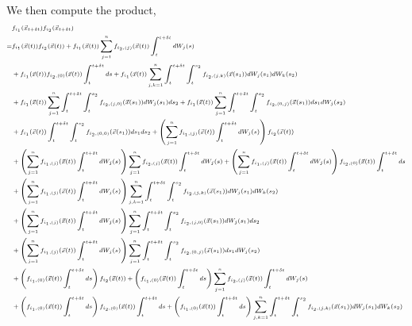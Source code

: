 \documentclass[12pt]{article}
\begin{document}
%
We then compute the product,
%
\begin{equation}
\scriptsize
\begin{aligned}
&f_{i_1}(\vec{x}_{t + \delta t}) f_{i_2}(\vec{x}_{t + \delta t}) \\
=& 
f_{i_1}(\vec{x}(t)) f_{i_2}(\vec{x}(t)) 
+  f_{i_1}(\vec{x}(t)) \sum_{j=1}^n f_{{i_2},(j)}(\vec{x}(t)) \int_t^{t + \delta t} dW_j(s) \\
&+  f_{i_1}(\vec{x}(t)) f_{{i_2},(0)}(\vec{x}(t)) \int_t^{t + \delta t} ds
+ f_{i_1}(\vec{x}(t)) \sum_{j, k=1}^n \int_t^{t+\delta t} \int_t^{s_2} f_{{i_2}, (j,k)}(\vec{x}(s_1)) dW_j(s_1) dW_k(s_2) \\
&+ f_{i_1}(\vec{x}(t)) \sum_{j=1}^n \int_t^{t+\delta t} \int_t^{s_2} f_{{i_2}, (j,0)}(\vec{x}(s_1)) dW_j(s_1) ds_2 
+ f_{i_1}(\vec{x}(t)) \sum_{j=1}^n \int_t^{t+\delta t} \int_t^{s_2} f_{{i_2}, (0,j)}(\vec{x}(s_1)) ds_1 dW_j(s_2) \\
&+ f_{i_1}(\vec{x}(t)) \int_t^{t+\delta t} \int_t^{s_2} f_{{i_2}, (0,0)}(\vec{x}(s_1)) ds_1 ds_2 
+ \left( \sum_{j=1}^n f_{{i_1},(j)}(\vec{x}(t)) \int_t^{t + \delta t} dW_j(s) \right) f_{i_2}(\vec{x}(t)) \\
&+ \left( \sum_{j=1}^n f_{{i_1},(j)}(\vec{x}(t)) \int_t^{t + \delta t} dW_j(s) \right) \sum_{j=1}^n f_{{i_2},(j)}(\vec{x}(t)) \int_t^{t + \delta t} dW_j(s) 
+  \left(\sum_{j=1}^n f_{{i_1},(j)}(\vec{x}(t)) \int_t^{t + \delta t} dW_j(s) \right)f_{{i_2},(0)}(\vec{x}(t)) \int_t^{t + \delta t} ds \\
&+ \left(\sum_{j=1}^n f_{{i_1},(j)}(\vec{x}(t)) \int_t^{t + \delta t} dW_j(s) \right) \sum_{j, k=1}^n \int_t^{t+\delta t} \int_t^{s_2} f_{{i_2},(j,k)}(\vec{x}(s_1)) dW_j(s_1) dW_k(s_2) \\
&+ \left(\sum_{j=1}^n f_{{i_1},(j)}(\vec{x}(t)) \int_t^{t + \delta t} dW_j(s) \right)\sum_{j=1}^n \int_t^{t+\delta t} \int_t^{s_2} f_{{i_2},(j,0)}(\vec{x}(s_1)) dW_j(s_1) ds_2 \\
&+ \left(\sum_{j=1}^n f_{{i_1},(j)}(\vec{x}(t)) \int_t^{t + \delta t} dW_j(s) \right)\sum_{j=1}^n \int_t^{t+\delta t} \int_t^{s_2} f_{{i_2},(0,j)}(\vec{x}(s_1)) ds_1 dW_j(s_2) \\
&+\left( f_{{i_1},(0)}(\vec{x}(t)) \int_t^{t + \delta t} ds \right) f_{i_2}(\vec{x}(t)) 
+  \left( f_{{i_1},(0)}(\vec{x}(t)) \int_t^{t + \delta t} ds \right)\sum_{j=1}^n f_{{i_2},(j)}(\vec{x}(t)) \int_t^{t + \delta t} dW_j(s) \\
&+  \left( f_{{i_1},(0)}(\vec{x}(t)) \int_t^{t + \delta t} ds \right)f_{{i_2},(0)}(\vec{x}(t)) \int_t^{t + \delta t} ds
+ \left( f_{{i_1},(0)}(\vec{x}(t)) \int_t^{t + \delta t} ds \right)\sum_{j, k=1}^n \int_t^{t+\delta t} \int_t^{s_2} f_{{i_2},(j,k)}(\vec{x}(s_1)) dW_j(s_1) dW_k(s_2) \\

\end{aligned}
\end{equation}
\end{document}
